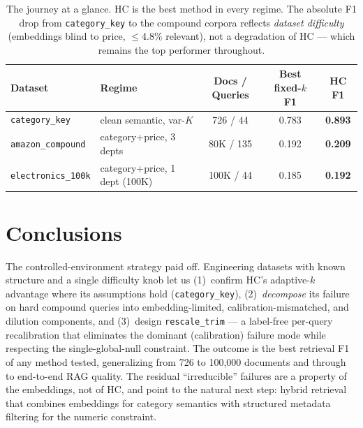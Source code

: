 \documentclass[11pt]{article}
\begin{document}
\begin{table}[H]
\centering
\begin{tabular}{llccc}
\toprule
\textbf{Dataset} & \textbf{Regime} & \textbf{Docs / Queries} & \textbf{Best fixed-$k$ F1} & \textbf{HC F1} \\
\midrule
\texttt{category\_key}   & clean semantic, var-$K$        & 726 / 44      & 0.783 & \textbf{0.893} \\
\texttt{amazon\_compound}& category+price, 3 depts        & 80K / 135     & 0.192 & \textbf{0.209} \\
\texttt{electronics\_100k}& category+price, 1 dept (100K)  & 100K / 44     & 0.185 & \textbf{0.192} \\
\bottomrule
\end{tabular}
\caption{The journey at a glance. HC is the best method in every regime. The
absolute F1 drop from \texttt{category\_key} to the compound corpora reflects
\emph{dataset difficulty} (embeddings blind to price, $\le$4.8\% relevant), not
a degradation of HC --- which remains the top performer throughout.}
\end{table}

\section{Conclusions}

The controlled-environment strategy paid off. Engineering datasets with known
structure and a single difficulty knob let us (1)~confirm HC's adaptive-$k$
advantage where its assumptions hold (\texttt{category\_key}), (2)~\emph{decompose}
its failure on hard compound queries into embedding-limited, calibration-mismatched,
and dilution components, and (3)~design \texttt{rescale\_trim} --- a label-free
per-query recalibration that eliminates the dominant (calibration) failure mode
while respecting the single-global-null constraint. The outcome is the best retrieval
F1 of any method tested, generalizing from 726 to 100{,}000 documents and through to
end-to-end RAG quality. The residual ``irreducible'' failures are a property of the
embeddings, not of HC, and point to the natural next step: hybrid retrieval that
combines embeddings for category semantics with structured metadata filtering
for the numeric constraint.
\end{document}
